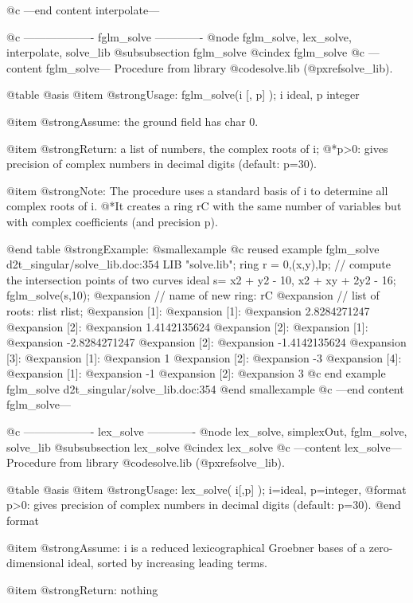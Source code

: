 @c ---end content interpolate---

@c ------------------- fglm_solve -------------
@node fglm_solve, lex_solve, interpolate, solve_lib
@subsubsection fglm_solve
@cindex fglm_solve
@c ---content fglm_solve---
Procedure from library @code{solve.lib} (@pxref{solve_lib}).

@table @asis
@item @strong{Usage:}
fglm_solve(i [, p] ); i ideal, p integer

@item @strong{Assume:}
the ground field has char 0.

@item @strong{Return:}
a list of numbers, the complex roots of i;
@*p>0: gives precision of complex numbers in decimal digits (default:
p=30).

@item @strong{Note:}
The procedure uses a standard basis of i to determine all complex
roots of i.
@*It creates a ring rC with the same number of variables but with
complex coefficients (and precision p).

@end table
@strong{Example:}
@smallexample
@c reused example fglm_solve d2t_singular/solve_lib.doc:354 
LIB "solve.lib";
ring r = 0,(x,y),lp;
// compute the intersection points of two curves
ideal s=  x2 + y2 - 10, x2 + xy + 2y2 - 16;
fglm_solve(s,10);
@expansion{} // name of new ring: rC
@expansion{} // list of roots: rlist
rlist;
@expansion{} [1]:
@expansion{}    [1]:
@expansion{}       2.8284271247
@expansion{}    [2]:
@expansion{}       1.4142135624
@expansion{} [2]:
@expansion{}    [1]:
@expansion{}       -2.8284271247
@expansion{}    [2]:
@expansion{}       -1.4142135624
@expansion{} [3]:
@expansion{}    [1]:
@expansion{}       1
@expansion{}    [2]:
@expansion{}       -3
@expansion{} [4]:
@expansion{}    [1]:
@expansion{}       -1
@expansion{}    [2]:
@expansion{}       3
@c end example fglm_solve d2t_singular/solve_lib.doc:354
@end smallexample
@c ---end content fglm_solve---

@c ------------------- lex_solve -------------
@node lex_solve, simplexOut, fglm_solve, solve_lib
@subsubsection lex_solve
@cindex lex_solve
@c ---content lex_solve---
Procedure from library @code{solve.lib} (@pxref{solve_lib}).

@table @asis
@item @strong{Usage:}
lex_solve( i[,p] ); i=ideal, p=integer,
 @format
  p>0: gives precision of complex numbers in decimal digits (default: p=30).
 @end format

@item @strong{Assume:}
i is a reduced lexicographical Groebner bases of a zero-dimensional
ideal, sorted by increasing leading terms.

@item @strong{Return:}
nothing

